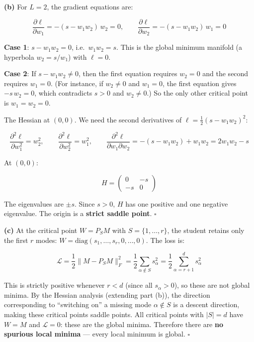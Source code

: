\documentclass[
]{article}
\begin{document}
\textbf{(b)} For \(L = 2\), the gradient equations are:

\[\frac{\partial \ell}{\partial w_1} = -(s - w_1 w_2)\,w_2 = 0, \qquad \frac{\partial \ell}{\partial w_2} = -(s - w_1 w_2)\,w_1 = 0\]

\textbf{Case 1}: \(s - w_1 w_2 = 0\), i.e.~\(w_1 w_2 = s\). This is the
global minimum manifold (a hyperbola \(w_2 = s/w_1\)) with \(\ell = 0\).

\textbf{Case 2}: If \(s - w_1 w_2 \neq 0\), then the first equation
requires \(w_2 = 0\) and the second requires \(w_1 = 0\). (For instance,
if \(w_2 \neq 0\) and \(w_1 = 0\), the first equation gives
\(-s\,w_2 = 0\), which contradicts \(s > 0\) and \(w_2 \neq 0\).) So the
only other critical point is \(w_1 = w_2 = 0\).

The Hessian at \((0,0)\). We need the second derivatives of
\(\ell = \frac{1}{2}(s - w_1 w_2)^2\):

\[\frac{\partial^2 \ell}{\partial w_1^2} = w_2^2, \qquad \frac{\partial^2 \ell}{\partial w_2^2} = w_1^2, \qquad \frac{\partial^2 \ell}{\partial w_1 \partial w_2} = -(s - w_1 w_2) + w_1 w_2 = 2w_1 w_2 - s\]

At \((0,0)\):

\[H = \begin{pmatrix} 0 & -s \\ -s & 0 \end{pmatrix}\]

The eigenvalues are \(\pm s\). Since \(s > 0\), \(H\) has one positive
and one negative eigenvalue. The origin is a \textbf{strict saddle
point}. \(\square\)

\textbf{(c)} At the critical point \(W = P_S M\) with
\(S = \{1, \ldots, r\}\), the student retains only the first \(r\)
modes: \(W = \text{diag}(s_1, \ldots, s_r, 0, \ldots, 0)\). The loss is:

\[\mathcal{L} = \frac{1}{2}\|M - P_S M\|_F^2 = \frac{1}{2}\sum_{\alpha \notin S} s_\alpha^2 = \frac{1}{2}\sum_{\alpha=r+1}^d s_\alpha^2\]

This is strictly positive whenever \(r < d\) (since all
\(s_\alpha > 0\)), so these are not global minima. By the Hessian
analysis (extending part (b)), the direction corresponding to
``switching on'' a missing mode \(\alpha \notin S\) is a descent
direction, making these critical points saddle points. All critical
points with \(|S| = d\) have \(W = M\) and \(\mathcal{L} = 0\): these
are the global minima. Therefore there are \textbf{no spurious local
minima} --- every local minimum is global. \(\square\)
\end{document}
